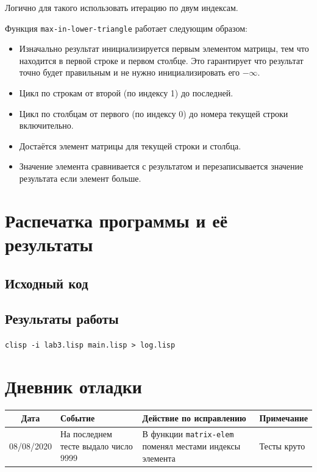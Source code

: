 \documentclass[12pt]{article}
\begin{document}
Логично для такого использовать итерацию по двум индексам.

Функция {\tt max-in-lower-triangle} работает следующим образом:
\begin{itemize}
\setlength{\itemsep}{-1mm} %
\item Изначально результат инициализируется первым элементом матрицы, тем что находится в первой
  строке и первом столбце. Это гарантирует что результат точно будет правильным и не нужно
  инициализировать его $-\infty$.
\item Цикл по строкам от второй (по индексу 1) до последней.
\item Цикл по столбцам от первого (по индексу 0) до номера текущей строки включительно.
\item Достаётся элемент матрицы для текущей строки и столбца.
\item Значение элемента сравнивается с результатом и перезаписывается значение результата если
  элемент больше.
\end{itemize}

\section{Распечатка программы и её результаты}

\subsection{Исходный код}

\subsection{Результаты работы}
\lstinline{clisp -i lab3.lisp main.lisp > log.lisp}

\section{Дневник отладки}
\noindent
\begin{tabularx}{\linewidth}{|c|X|X|X|}
\hline
Дата & Событие & Действие по исправлению & Примечание \\
\hline
08/08/2020 & На последнем тесте выдало число 9999 & В функции {\tt matrix-elem} поменял местами индексы элемента & Тесты круто \\
\hline
\end{tabularx}
\end{document}
